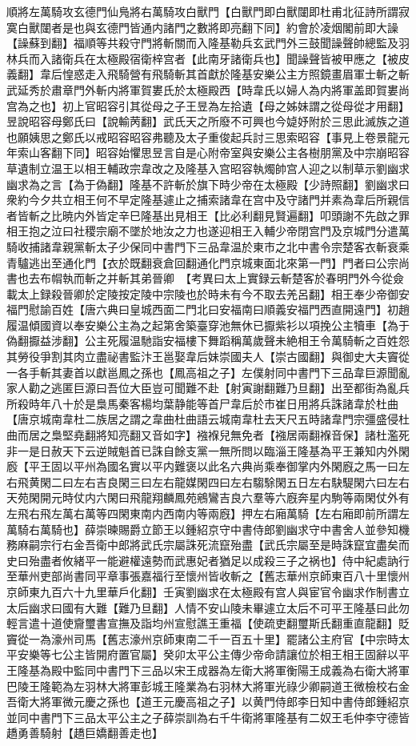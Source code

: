 順將左萬騎攻玄德門仙鳬將右萬騎攻白獸門【白獸門即白獸闥即杜甫北征詩所謂寂寞白獸闥者是也與玄德門皆通内諸門之數將即亮翻下同】約會於凌烟閣前即大譟【譟蘇到翻】福順等共殺守門將斬關而入隆基勒兵玄武門外三鼓聞譟聲帥總監及羽林兵而入諸衛兵在太極殿宿衛梓宫者【此南牙諸衛兵也】聞譟聲皆被甲應之【被皮義翻】韋后惶惑走入飛騎營有飛騎斬其首獻於隆基安樂公主方照鏡畫眉軍士斬之斬武延秀於肅章門外斬内將軍賀婁氏於太極殿西【時韋氏以婦人為内將軍盖即賀婁尚宫為之也】初上官昭容引其從母之子王昱為左拾遺【母之姊妹謂之從母從才用翻】昱說昭容母鄭氏曰【說輸苪翻】武氏天之所廢不可興也今媫妤附於三思此滅族之道也願姨思之鄭氏以戒昭容昭容弗聽及太子重俊起兵討三思索昭容【事見上卷景龍元年索山客翻下同】昭容始懼思昱言自是心附帝室與安樂公主各樹朋黨及中宗崩昭容草遺制立温王以相王輔政宗韋改之及隆基入宫昭容執燭帥宫人迎之以制草示劉幽求幽求為之言【為于偽翻】隆基不許斬於旗下時少帝在太極殿【少詩照翻】劉幽求曰衆約今夕共立相王何不早定隆基遽止之捕索諸韋在宫中及守諸門并素為韋后所親信者皆斬之比暁内外皆定辛巳隆基出見相王【比必利翻見賢遍翻】叩頭謝不先啟之罪相王抱之泣曰社稷宗廟不墜於地汝之力也遂迎相王入輔少帝閉宫門及京城門分遣萬騎收捕諸韋親黨斬太子少保同中書門下三品韋温於東市之北中書令宗楚客衣斬衰乘青驢逃出至通化門【衣於既翻衰倉回翻通化門京城東面北來第一門】門者曰公宗尚書也去布㡌執而斬之并斬其弟晉卿　【考異曰太上實録云斬楚客於春明門外今從僉載太上録殺晉卿於定陵按定陵中宗陵也於時未有今不取去羌呂翻】相王奉少帝御安福門慰諭百姓【唐六典曰皇城西面二門北曰安福南曰順義安福門西直開遠門】初趙履温傾國資以奉安樂公主為之起第舍築臺穿池無休已擫紫衫以項挽公主犢車【為于偽翻擫益涉翻】公主死履温馳詣安福樓下舞蹈稱萬歲聲未絶相王令萬騎斬之百姓怨其勞役爭割其肉立盡祕書監汴王邕娶韋后妹崇國夫人【崇古國翻】與御史大夫竇從一各手斬其妻首以獻邕鳳之孫也【鳳高祖之子】左僕射同中書門下三品韋巨源聞亂家人勸之逃匿巨源曰吾位大臣豈可聞難不赴【射寅謝翻難乃旦翻】出至都街為亂兵所殺時年八十於是梟馬秦客楊均葉静能等首尸韋后於市崔日用將兵誅諸韋於杜曲【唐京城南韋杜二族居之謂之韋曲杜曲語云城南韋杜去天尺五時諸韋門宗彊盛侵杜曲而居之梟堅堯翻將知亮翻又音如字】襁褓兒無免者【襁居兩翻褓音保】諸杜濫死非一是日赦天下云逆賊魁首已誅自餘支黨一無所問以臨淄王隆基為平王兼知内外閑廏【平王固以平州為國名實以平内難褒以此名六典尚乘奉御掌内外閑廐之馬一曰左右飛黄閑二曰左右吉良閑三曰左右龍媒閑四曰左右騶駼閑五日左右駃騠閑六曰左右天苑閑開元時仗内六閑曰飛龍翔麟鳳苑鵷鸞吉良六羣等六廐奔星内駒等兩閑仗外有左飛右飛左萬右萬等四閑東南内西南内等兩廐】押左右廂萬騎【左右廂即前所謂左萬騎右萬騎也】薛崇暕賜爵立節王以鍾紹京守中書侍郎劉幽求守中書舍人並參知機務麻嗣宗行右金吾衛中郎將武氏宗屬誅死流竄殆盡【武氏宗屬至是時誅竄宜盡矣而史曰殆盡者攸緒平一能避權遠勢而武惠妃者猶足以成殺三子之祸也】侍中紀處訥行至華州吏部尚書同平章事張嘉福行至懷州皆收斬之【舊志華州京師東百八十里懷州京師東九百六十九里華戶化翻】壬寅劉幽求在太極殿有宫人與宦官令幽求作制書立太后幽求曰國有大難【難乃旦翻】人情不安山陵未畢遽立太后不可平王隆基曰此勿輕言遣十道使齎璽書宣撫及詣均州宣慰譙王重福【使疏吏翻璽斯氏翻重直龍翻】貶竇從一為濠州司馬【舊志濠州京師東南二千一百五十里】罷諸公主府官【中宗時太平安樂等七公主皆開府置官屬】癸卯太平公主傳少帝命請讓位於相王相王固辭以平王隆基為殿中監同中書門下三品以宋王成器為左衛大將軍衡陽王成義為右衛大將軍巴陵王隆範為左羽林大將軍彭城王隆業為右羽林大將軍光祿少卿嗣道王微檢校右金吾衛大將軍微元慶之孫也【道王元慶高祖之子】以黄門侍郎李日知中書侍郎鍾紹京並同中書門下三品太平公主之子薛崇訓為右千牛衛將軍隆基有二奴王毛仲李守德皆趫勇善騎射【趫巨嬌翻善走也】